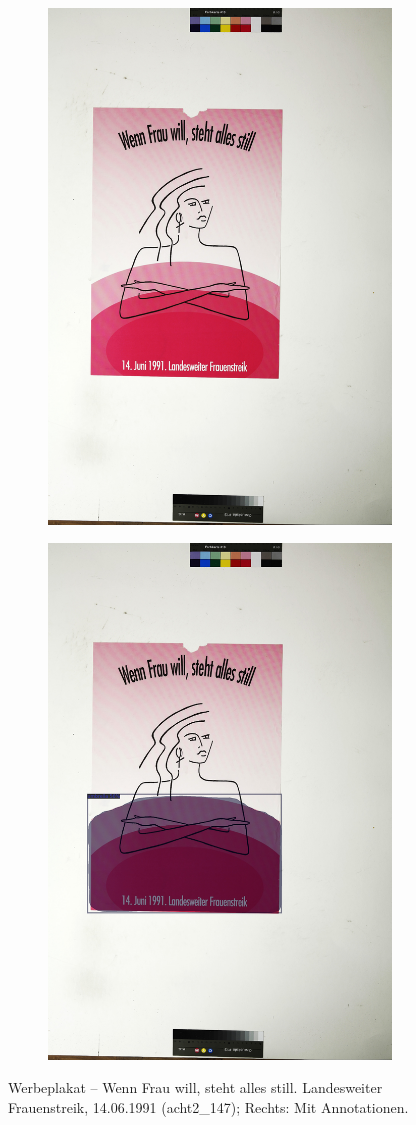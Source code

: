 \documentclass[a4paper,12pt,ngerman]{article}
\begin{document}
\newpage
\begin{landscape}
\begin{figure}[ht]
	\begin{subfigure}[b]{0.5\linewidth}
	\centering
	\includegraphics[height=\linewidth]{Abbildung_40_(acht2_147)}
	\end{subfigure}
	\begin{subfigure}[b]{0.5\linewidth}
	\centering
	\includegraphics[height=\linewidth]{Abbildung_40_(acht2_147)_with_detections}
	\end{subfigure}
	\caption{Werbeplakat -- Wenn Frau will, steht alles still. Landesweiter Frauenstreik, 14.06.1991 (acht2\_147); Rechts: Mit Annotationen.}
\end{figure}
\end{landscape}
\end{document}
